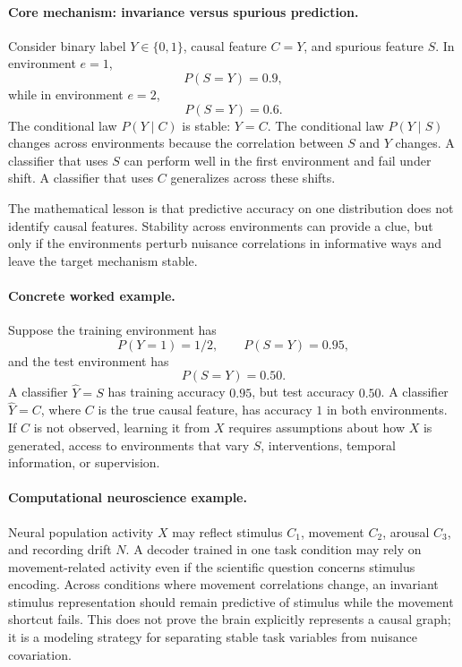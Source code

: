 \paragraph{Core mechanism: invariance versus spurious prediction.}
Consider binary label \(Y\in\{0,1\}\), causal feature \(C=Y\), and spurious feature \(S\). In environment \(e=1\),
\[
P(S=Y)=0.9,
\]
while in environment \(e=2\),
\[
P(S=Y)=0.6.
\]
The conditional law \(P(Y\mid C)\) is stable: \(Y=C\). The conditional law \(P(Y\mid S)\) changes across environments because the correlation between \(S\) and \(Y\) changes. A classifier that uses \(S\) can perform well in the first environment and fail under shift. A classifier that uses \(C\) generalizes across these shifts.

The mathematical lesson is that predictive accuracy on one distribution does not identify causal features. Stability across environments can provide a clue, but only if the environments perturb nuisance correlations in informative ways and leave the target mechanism stable.

\paragraph{Concrete worked example.}
Suppose the training environment has
\[
P(Y=1)=1/2,\qquad P(S=Y)=0.95,
\]
and the test environment has
\[
P(S=Y)=0.50.
\]
A classifier \(\hat Y=S\) has training accuracy \(0.95\), but test accuracy \(0.50\). A classifier \(\hat Y=C\), where \(C\) is the true causal feature, has accuracy \(1\) in both environments. If \(C\) is not observed, learning it from \(X\) requires assumptions about how \(X\) is generated, access to environments that vary \(S\), interventions, temporal information, or supervision.

\paragraph{Computational neuroscience example.}
Neural population activity \(X\) may reflect stimulus \(C_1\), movement \(C_2\), arousal \(C_3\), and recording drift \(N\). A decoder trained in one task condition may rely on movement-related activity even if the scientific question concerns stimulus encoding. Across conditions where movement correlations change, an invariant stimulus representation should remain predictive of stimulus while the movement shortcut fails. This does not prove the brain explicitly represents a causal graph; it is a modeling strategy for separating stable task variables from nuisance covariation.

